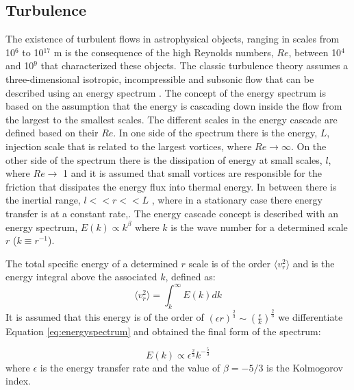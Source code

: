 \documentclass[fleqn,usenatbib, useAMS, a4paper]{mnras}
\begin{document}
\subsection{Turbulence}

The existence of turbulent flows in astrophysical objects, ranging in scales from 10$^{6}$ to 10$^{17}$ m \citep{2010ApJ...710..853C} is the consequence of the high Reynolds numbers, $Re$, between 10$^{4}$ and 10$^{9}$ \citep{1949ApJ...110..329C,lagrois2011} that characterized these objects.
The classic turbulence theory assumes a three-dimensional isotropic, incompressible and subsonic flow that can be described using an energy spectrum \citep{kolm1}.
The concept of the energy spectrum is based on the assumption that the energy is cascading down inside the flow from the largest to the smallest scales.
The different scales in the energy cascade are defined based on their $Re$.
In one side of the spectrum there is the energy, \(L\), injection scale that is related to the largest vortices, where $ Re \rightarrow \infty$.
On the other side of the spectrum there is the dissipation of energy at small scales, \(l\), where $Re \rightarrow$ 1 and it is assumed that small vortices are responsible for the friction that dissipates the energy flux into thermal energy.
In between there is the inertial range, \(l  << r << L\) , where in a stationary case there energy transfer is at a constant rate,.
The energy cascade concept is described with an energy spectrum, $E(k) \propto k^{\beta}$ where $k$ is the wave number for a determined scale $r$ ($k \equiv r^{-1}$).

The total specific energy of a determined $r$ scale is of the order $\langle v_{r}^{2} \rangle$ and is the energy integral above the associated $k$, defined as:
\begin{equation}\label{eq:energyspectrum}
 \langle v_{r}^{2} \rangle = \int_{k}^{\infty} E(k)dk
\end{equation}
%
It is assumed that this energy is of the order of $(\epsilon r)^{\frac{2}{3}} \sim (\frac{\epsilon}{k})^{\frac{2}{3}}$ we differentiate Equation \ref{eq:energyspectrum} and obtained the final form of the spectrum:

\begin{equation}\label{eq:kolm}
E(k) \propto \epsilon^\frac{2}{3} k^{-\frac{5}{3}}
\end{equation}
%
where \(\epsilon\) is the energy transfer rate and the value of $\beta = -5 / 3$ is the Kolmogorov index.
\end{document}
